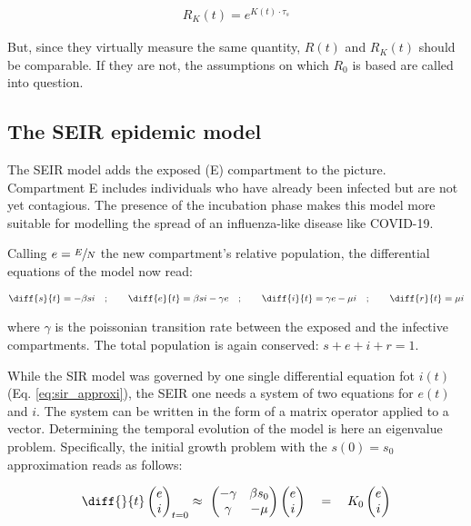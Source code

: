 \documentclass[DIV=12, BCOR=0pt]{scrartcl}  %
\begin{document}
  \begin{align}
  	R_K(t) = e^{K(t) \cdot \tau_s}
  	\label{eq:RKt}
  \end{align}

	But, since they virtually measure the same quantity, $R(t)$ and $R_K(t)$ should be comparable. If they are not, the assumptions on which $R_0$ is based are called into question.
  
  \subsection{The SEIR epidemic model}
  The SEIR model adds the exposed (E) compartment to the picture. Compartment E includes individuals who have already been infected but are not yet contagious. The presence of the incubation phase makes this model more suitable for modelling the spread of an influenza-like disease like COVID-19. 
  
  Calling $e = \sfrac{E}{N}$ the new compartment's relative population, the differential equations of the model now read:
  
  \begin{align}
  	\diff{s}{t} = - \beta s i \quad;  \qquad 	\diff{e}{t} = \beta s i - \gamma e \quad; \qquad \diff{i}{t} = \gamma e - \mu i \quad; \qquad \diff{r}{t} = \mu i
  	\label{eq:seir}
  \end{align}

  where $\gamma$ is the poissonian transition rate between the exposed and the infective compartments. The total population is again conserved: $ s + e + i + r = 1$.
  
  While the SIR model was governed by one single differential equation fot $i(t)$ (Eq. \ref{eq:sir_approxi}), the SEIR one needs a system of two equations for $e(t)$ and $i$.
  The system can be written in the form of a matrix operator applied to a vector. Determining the temporal evolution of the model is here an eigenvalue problem. Specifically, the initial growth problem with the $s(0) = s_0$ approximation reads as follows: 
  
  \begin{align}
  	\diff{}{t}
  	\begin{pmatrix}
  			e \\
  			i
  	\end{pmatrix}_{t=0}
  	\approx \
  	\begin{pmatrix}
  		 - \gamma & \beta s_0\\
  		 \gamma & - \mu
  	\end{pmatrix}
  	\begin{pmatrix}
  		e \\
  		i
  	\end{pmatrix}
	  \quad = \quad K_0 %
	  \begin{pmatrix}
	  	e \\
	  	i
	  \end{pmatrix} %
		\label{eq:seir_approxi}
	\end{align}
\end{document}
